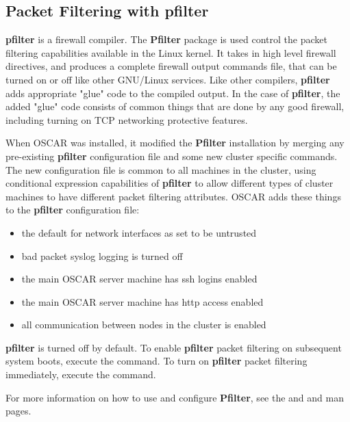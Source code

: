 %
%
%

\subsection{Packet Filtering with pfilter}
\label{app:pfilter-overview}

{\bf pfilter} is a firewall compiler.  The {\bf Pfilter} package is
used control the packet filtering capabilities available in the Linux
kernel.  It takes in high level firewall directives, and produces a
complete firewall output commands file, that can be turned on or off
like other GNU/Linux services.  Like other compilers, {\bf pfilter}
adds appropriate "glue" code to the compiled output.  In the case of
{\bf pfilter}, the added "glue" code consists of common things that
are done by any good firewall, including turning on TCP networking
protective features.

When OSCAR was installed, it modified the {\bf Pfilter} installation
by merging any pre-existing {\bf pfilter} configuration file and some
new cluster specific commands.  The new configuration file is common
to all machines in the cluster, using conditional expression
capabilities of {\bf pfilter} to allow different types of cluster
machines to have different packet filtering attributes.  OSCAR adds
these things to the {\bf pfilter} configuration file:

\begin{itemize}
\item the default for network interfaces as set to be untrusted
\item bad packet syslog logging is turned off
\item the main OSCAR server machine has ssh logins enabled
\item the main OSCAR server machine has http access enabled
\item all communication between nodes in the cluster is enabled
\end{itemize}

{\bf pfilter} is turned off by default. To enable {\bf pfilter} packet
filtering on subsequent system boots, execute the  command. To turn on {\bf pfilter} packet
filtering immediately, execute the 
command.

For more information on how to use and configure {\bf Pfilter},
see the  and  and 
 man pages.
